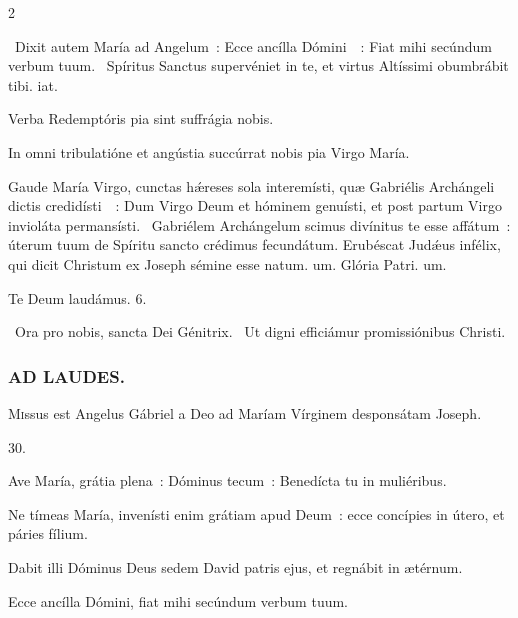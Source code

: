 \documentclass[9pt,twoside]{extarticle}
\begin{document}
\begin{multicols}{2}
{\begin{tightlist}{}
\item {}~Dixit autem María ad Angelum~: Ecce ancílla Dómini~~: \textred{*} Fiat mihi secúndum verbum tuum. ~Spíritus Sanctus supervéniet in te, et virtus Altíssimi obumbrábit tibi. iat.
\item {} Verba Redemptóris pia sint suffrágia nobis.
\item {} In omni tribulatióne et angústia succúrrat nobis pia Virgo María.
\item {} Gaude María Virgo, cunctas hǽreses sola interemísti, quæ Gabriélis Archángeli dictis credidísti~~: \textred{*} Dum Virgo Deum et hóminem genuísti, et post partum Virgo invioláta permansísti. ~Gabriélem Archángelum scimus divínitus te esse affátum~: úterum tuum de Spíritu sancto crédimus fecundátum. Erubéscat Judǽus infélix, qui dicit Christum ex Joseph sémine esse natum. um. Glória Patri. um.
\item Te Deum laudámus. 6.
\item {}~Ora pro nobis, sancta Dei Génitrix. ~Ut digni efficiámur promissiónibus Christi.
\end{tightlist}

\subsubsection*{\center \textsc{AD LAUDES.}}
\begin{center}\end{center}
\lettrine{M}issus est Angelus Gábriel a Deo ad Maríam Vírginem desponsátam Joseph.

\begin{tightlist}{}
\item {} 30.
\item {} Ave María, grátia plena~: Dóminus tecum~: Benedícta tu in muliéribus.
\item {} Ne tímeas María, invenísti enim grátiam apud Deum~: ecce concípies in útero, et páries fílium.
\item {} Dabit illi Dóminus Deus sedem David patris ejus, et regnábit in ætérnum.
\item {} Ecce ancílla Dómini, fiat mihi secúndum verbum tuum.
\end{tightlist}

}
\end{multicols}
\end{document}
